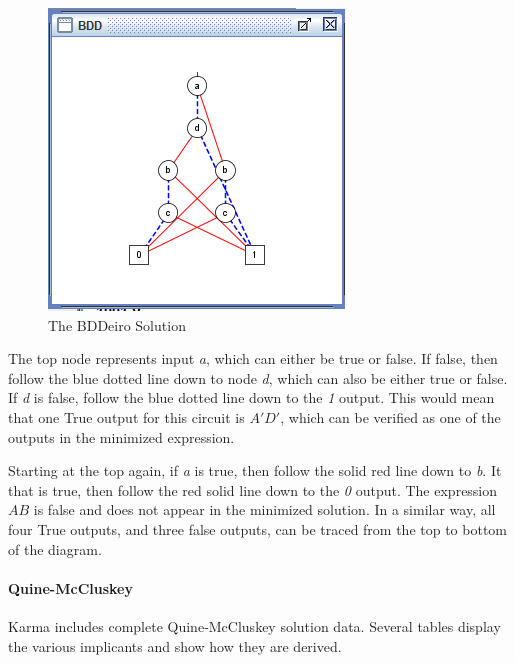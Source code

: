 \begin{figure}[H]
	\centering
	\includegraphics[width=\maxwidth{.95\linewidth}]{gfx/07_06}
	\caption{The BDDeiro Solution}
	\label{fig:07_06}
\end{figure}

The top node represents input \textit{a}, which can either be true or false. If false, then follow the blue dotted line down to node \textit{d}, which can also be either true or false. If \textit{d} is false, follow the blue dotted line down to the \textit{1} output. This would mean that one True output for this circuit is $ A'D' $, which can be verified as one of the outputs in the minimized expression.

Starting at the top again, if \textit{a} is true, then follow the solid red line down to \textit{b}. It that is true, then follow the red solid line down to the \textit{0} output. The expression $ AB $ is false and does not appear in the minimized solution. In a similar way, all four True outputs, and three false outputs, can be traced from the top to bottom of the diagram.

\paragraph{Quine-McCluskey}

Karma includes complete Quine‐McCluskey solution data. Several tables display the various implicants and show how they are derived.

